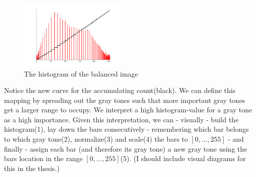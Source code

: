 \documentclass{article}
\newcommand{\note}[1]{{\tiny (#1)}}
\newcommand{\range}[2]{$[#1,...,#2]$}
\begin{document}
      \begin{figure}[h]
        \centering
        \includegraphics[width=0.45\textwidth]{hist-eq}
        \caption{The histogram of the balanced image}
        \label{fig:hist-eq}
      \end{figure}
      
      Notice the new curve for the accumulating count(black). We can define
      this mapping by spreading out the gray tones such that more
      important gray tones get a larger range to occupy. We interpret
      a high histogram-value for a gray tone as a high importance.
      Given this interpretation, we can - visually - build the histogram(1),
      lay down the bars consecutively - remembering which
      bar belongs to which gray tone(2), normalize(3) and scale(4) the bars to \range{0}{255} - 
      and finally - assign each bar (and therefore its gray tone) a new gray tone
      using the bars location in the range \range{0}{255}(5). \note{I should include visual diagrams for this in the thesis.}
      
\end{document}
